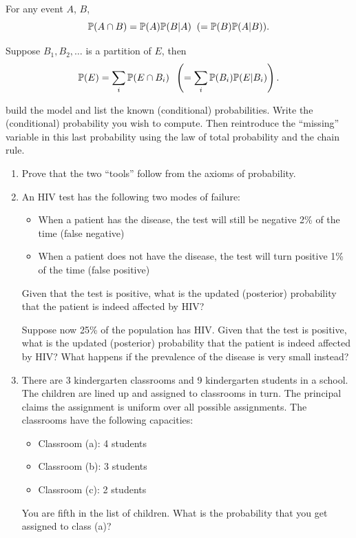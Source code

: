 \documentclass{article}
\begin{document}
 For any event $A$, $B$, 
\[\P(A \cap B) = \P(A) \P(B | A) \;\; (= \P(B) \P(A | B)).\] 

 Suppose $B_1, B_2, \dots$ is a partition of $E$, then
\[ \P(E) = \sum_i \P(E \cap B_i) \;\; \left(= \sum_i \P(B_i) \P(E | B_i)\right). \]

 build the model and list the known (conditional) probabilities. Write the (conditional) probability you wish to compute. Then reintroduce the ``missing'' variable in this last probability using the law of total probability and the chain rule.  

\begin{enumerate}
	\item Prove that the two ``tools'' follow from the axioms of probability.
	\item An HIV test has the following two modes of failure:
	\begin{itemize}
		\item When a patient has the disease, the test will still be negative 2\% of the time (false negative)
		\item When a patient does not have the disease, the test will turn positive 1\% of the time (false positive)
	\end{itemize}
	Given that the test is positive, what is the updated (posterior) probability that the patient is indeed affected by HIV?

	Suppose now 25\% of the population has HIV.
	Given that the test is positive, what is the updated (posterior) probability that the patient is indeed affected by HIV? What happens if the prevalence of the disease is very small instead?
	\item There are 3 kindergarten classrooms and 9 kindergarten students in a school. The children are lined up and assigned to classrooms in turn. The principal claims the assignment is uniform over all possible assignments. The classrooms 
	have the following capacities:

	\begin{itemize}
		\item Classroom (a): 4 students

		\item Classroom (b): 3 students
		\item Classroom (c): 2 students
	\end{itemize}

	You are fifth in the list of children. What is the probability that you get assigned to class (a)? 
\end{enumerate}
\end{document}
